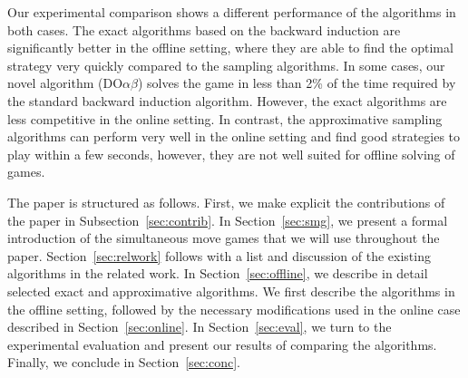 \documentclass[preprint,12pt]{elsarticle}
\newcommand{\reviewchange}[1]{{\color{black}#1}}
\newcommand{\doab}[0]{\textrm{DO}\alpha\beta}
\begin{document}
Our experimental comparison shows a different performance of the algorithms in both cases.
\reviewchange{The exact algorithms based on the backward induction are significantly better in the offline setting,
where they are able to find the optimal strategy very quickly compared to the sampling algorithms.}
In some cases, our novel algorithm ($\doab$) solves the game in less than 2\% of the time required by the standard backward induction algorithm.
However, the exact algorithms are less competitive in the online setting.
In contrast, the approximative sampling algorithms can perform very well in the online setting and
find good strategies to play within a few seconds, however, they are not well suited for offline solving of games.

The paper is structured as follows. \reviewchange{First, we make explicit the contributions of the paper in Subsection~\ref{sec:contrib}.}
In Section~\ref{sec:smg}, we present a formal introduction of the simultaneous move games that we will use throughout the paper.
Section~\ref{sec:relwork} follows with a list and discussion of the existing algorithms in the related work. In
Section~\ref{sec:offline}, we describe in detail selected exact and approximative algorithms.
We first describe the algorithms in the offline setting, followed by the necessary modifications used in the online
case described in Section~\ref{sec:online}.
In Section~\ref{sec:eval}, we turn to the experimental evaluation and present our results of comparing the algorithms.
Finally, we conclude in Section~\ref{sec:conc}.
\end{document}
